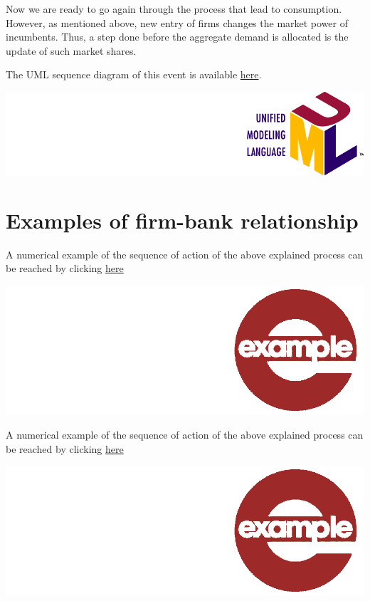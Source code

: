 \documentclass{book}
\newcommand{\doclocation}{file:///Users/giulioni/Documents/workspace/gabriele/docs}
\begin{document}
Now we are ready to go again through the process that lead to consumption. However, as mentioned above, new entry of firms changes the market power of incumbents. Thus, a step done before the aggregate demand is allocated is the update of such market shares.   


\vskip3mm
The UML sequence diagram of this event is available \href{\doclocation/umldoc/setupNewFirmsToComputeProductAttractiveness.html}{here}.
\begin{marginfigure}
	\includegraphics[scale=0.1]{uml.png}
\end{marginfigure}
\vskip3mm


\section*{Examples of firm-bank relationship}

A numerical example of the sequence of action of the above explained process can be reached by clicking \href{\doclocation/umldoc/example_firm_bad_conditions.html}{here}
\begin{marginfigure}
\hskip8mm	\includegraphics[scale=0.07]{example.png}
\end{marginfigure}

\vskip1cm
A numerical example of the sequence of action of the above explained process can be reached by clicking \href{\doclocation/umldoc/example_firm_good_conditions.html}{here}
\begin{marginfigure}
\hskip8mm	\includegraphics[scale=0.07]{example.png}
\end{marginfigure}
\end{document}
